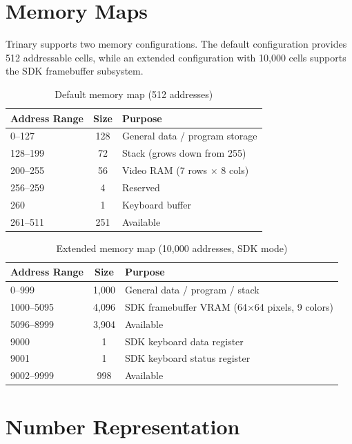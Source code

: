\documentclass[12pt,a4paper,twoside]{book}
\theoremstyle{trinarytheorem}
\theoremstyle{trinarydefinition}
\begin{document}
\section{Memory Maps}

Trinary supports two memory configurations. The default configuration provides 512
addressable cells, while an extended configuration with 10,000 cells supports the
SDK framebuffer subsystem.

\begin{table}[H]
\centering
\caption{Default memory map (512 addresses)}
\label{tab:memmap_default}
\begin{tabular}{lcl}
\toprule
Address Range & Size & Purpose \\
\midrule
0--127 & 128 & General data / program storage \\
128--199 & 72 & Stack (grows down from 255) \\
200--255 & 56 & Video RAM (7 rows $\times$ 8 cols) \\
256--259 & 4  & Reserved \\
260      & 1  & Keyboard buffer \\
261--511 & 251 & Available \\
\bottomrule
\end{tabular}
\end{table}

\begin{table}[H]
\centering
\caption{Extended memory map (10,000 addresses, SDK mode)}
\label{tab:memmap_extended}
\begin{tabular}{lcl}
\toprule
Address Range & Size & Purpose \\
\midrule
0--999    & 1,000 & General data / program / stack \\
1000--5095 & 4,096 & SDK framebuffer VRAM (64$\times$64 pixels, 9 colors) \\
5096--8999 & 3,904 & Available \\
9000      & 1     & SDK keyboard data register \\
9001      & 1     & SDK keyboard status register \\
9002--9999 & 998   & Available \\
\bottomrule
\end{tabular}
\end{table}

\section{Number Representation}
\end{document}
